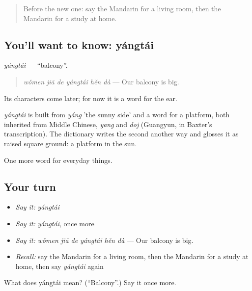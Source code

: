 \label{lesson:ZH-C159-yangtai}



\begin{quote}
Before the new one: say the Mandarin for a living room, then the Mandarin for a study at home.
\end{quote}

\subsection*{You'll want to know: yángtái}
\emph{yángtái} — \textquotedblleft{}balcony\textquotedblright{}.

\begin{quote}
\emph{wǒmen jiā de yángtái hěn dà} — Our balcony is big.
\end{quote}

Its characters come later; for now it is a word for the ear.

\begin{cousinweb}
\emph{yángtái} is built from \emph{yáng} 'the sunny side' and a word for a platform, both inherited from Middle Chinese, \emph{yang} and \emph{doj} (Guangyun, in Baxter's transcription). The dictionary writes the second another way and glosses it as raised square ground: a platform in the sun.
\end{cousinweb}

\begin{grammarlens}[title={What you've built}]
One more word for everyday things.
\end{grammarlens}

\subsection*{Your turn}
\begin{itemize}
\raggedright
  \item \emph{Say it:} \emph{yángtái}
  \item \emph{Say it:} \emph{yángtái}, once more
  \item \emph{Say it:} \emph{wǒmen jiā de yángtái hěn dà} — Our balcony is big.
  \item \emph{Recall:} say the Mandarin for a living room, then the Mandarin for a study at home, then say \emph{yángtái} again
\end{itemize}

\begin{tcolorbox}[breakable,colback=teal!4,colframe=teal!35!black,title={Before you move on}]
What does yángtái mean? (\textquotedblleft{}Balcony\textquotedblright{}.) Say it once more.
\end{tcolorbox}
